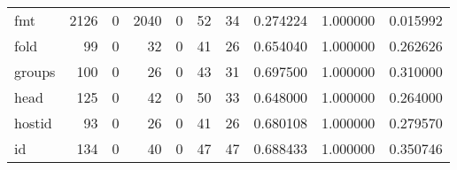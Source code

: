 \begin{longtable}{lrrrrrrrrr}
fmt       &                                               2126 &                                                  0 &                                               2040 &                                                  0 &                                                 52 &                                                 34 &                                           0.274224 &                               1.000000 &                             0.015992 \\
fold      &                                                 99 &                                                  0 &                                                 32 &                                                  0 &                                                 41 &                                                 26 &                                           0.654040 &                               1.000000 &                             0.262626 \\
groups    &                                                100 &                                                  0 &                                                 26 &                                                  0 &                                                 43 &                                                 31 &                                           0.697500 &                               1.000000 &                             0.310000 \\
head      &                                                125 &                                                  0 &                                                 42 &                                                  0 &                                                 50 &                                                 33 &                                           0.648000 &                               1.000000 &                             0.264000 \\
hostid    &                                                 93 &                                                  0 &                                                 26 &                                                  0 &                                                 41 &                                                 26 &                                           0.680108 &                               1.000000 &                             0.279570 \\
id        &                                                134 &                                                  0 &                                                 40 &                                                  0 &                                                 47 &                                                 47 &                                           0.688433 &                               1.000000 &                             0.350746 \\

\end{longtable}
